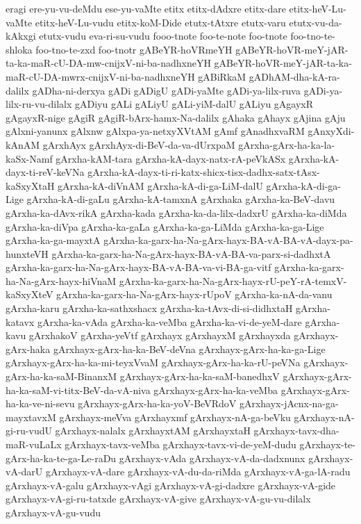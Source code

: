 {eragi
ere-yu-vu-deMdu
ese-yu-vaMte
etitx
etitx-dAdxre
etitx-dare
etitx-heV-Lu-vaMte
etitx-heV-Lu-vudu
etitx-koM-Dide
etutx-tAtxre
etutx-varu
etutx-vu-da-kAkxgi
etutx-vudu
eva-ri-su-vudu
fooo-tnote
foo-te-note
foo-tnote
foo-tno-te-shloka
foo-tno-te-zxd
foo-tnotr
gABeYR-hoVRmeYH
gABeYR-hoVR-meY-jAR-ta-ka-maR-cU-DA-mw-cnijxV-ni-ba-nadhxneYH
gABeYR-hoVR-meY-jAR-ta-ka-maR-cU-DA-mwrx-cnijxV-ni-ba-nadhxneYH
gABiRkaM
gADhAM-dha-kA-ra-dalilx
gADha-ni-derxya
gADi
gADigU
gADi-yaMte
gADi-ya-lilx-ruva
gADi-ya-lilx-ru-vu-dilalx
gADiyu
gALi
gALiyU
gALi-yiM-dalU
gALiyu
gAgayxR
gAgayxR-nige
gAgiR
gAgiR-bArx-hamx-Na-dalilx
gAhaka
gAhayx
gAjina
gAju
gAlxni-yanunx
gAlxnw
gAlxpa-ya-netxyXVtAM
gAmf
gAnadhxvaRM
gAnxyXdi-kAnAM
gArxhAyx
gArxhAyx-di-BeV-da-va-dUrxpaM
gArxha-gArx-ha-ka-la-kaSx-Namf
gArxha-kAM-tara
gArxha-kA-dayx-natx-rA-peVkASx
gArxha-kA-dayx-ti-reV-keVNa
gArxha-kA-dayx-ti-ri-katx-shicx-tisx-dadhx-satx-tAsx-kaSxyXtaH
gArxha-kA-diVnAM
gArxha-kA-di-ga-LiM-dalU
gArxha-kA-di-ga-Lige
gArxha-kA-di-gaLu
gArxha-kA-tamxnA
gArxhaka
gArxha-ka-BeV-davu
gArxha-ka-dAvx-rikA
gArxha-kada
gArxha-ka-da-lilx-dadxrU
gArxha-ka-diMda
gArxha-ka-diVpa
gArxha-ka-gaLa
gArxha-ka-ga-LiMda
gArxha-ka-ga-Lige
gArxha-ka-ga-mayxtA
gArxha-ka-garx-ha-Na-gArx-hayx-BA-vA-BA-vA-dayx-pa-hunxteVH
gArxha-ka-garx-ha-Na-gArx-hayx-BA-vA-BA-va-parx-si-dadhxtA
gArxha-ka-garx-ha-Na-gArx-hayx-BA-vA-BA-va-vi-BA-ga-vitf
gArxha-ka-garx-ha-Na-gArx-hayx-hiVnaM
gArxha-ka-garx-ha-Na-gArx-hayx-rU-peY-rA-temxV-kaSxyXteV
gArxha-ka-garx-ha-Na-gArx-hayx-rUpoV
gArxha-ka-nA-da-vanu
gArxha-karu
gArxha-ka-sathxshacx
gArxha-ka-tAvx-di-si-didhxtaH
gArxha-katavx
gArxha-ka-vAda
gArxha-ka-veMba
gArxha-ka-vi-de-yeM-dare
gArxha-kavu
gArxhakoV
gArxha-yeVtf
gArxhayx
gArxhayxM
gArxhayxda
gArxhayx-gArx-haka
gArxhayx-gArx-ha-ka-BeV-deVna
gArxhayx-gArx-ha-ka-ga-Lige
gArxhayx-gArx-ha-ka-mi-teyxVvaM
gArxhayx-gArx-ha-ka-rU-peVNa
gArxhayx-gArx-ha-ka-saM-BinanxM
gArxhayx-gArx-ha-ka-saM-banedhxV
gArxhayx-gArx-ha-ka-saM-vi-titx-BeV-da-vA-niva
gArxhayx-gArx-ha-ka-veMba
gArxhayx-gArx-ha-ka-ve-ni-sevu
gArxhayx-gArx-ha-ka-yoV-BeVRdoV
gArxhayx-jAcnx-na-ga-mayxtavxM
gArxhayx-meVva
gArxhayxmf
gArxhayx-nA-ga-beVku
gArxhayx-nA-gi-ru-vudU
gArxhayx-nalalx
gArxhayxtAM
gArxhayxtaH
gArxhayx-tavx-dha-maR-vuLaLx
gArxhayx-tavx-veMba
gArxhayx-tavx-vi-de-yeM-dudu
gArxhayx-te-gArx-ha-ka-te-ga-Le-raDu
gArxhayx-vAda
gArxhayx-vA-da-dadxnunx
gArxhayx-vA-darU
gArxhayx-vA-dare
gArxhayx-vA-du-da-riMda
gArxhayx-vA-ga-lA-radu
gArxhayx-vA-galu
gArxhayx-vAgi
gArxhayx-vA-gi-dadxre
gArxhayx-vA-gide
gArxhayx-vA-gi-ru-tatxde
gArxhayx-vA-give
gArxhayx-vA-gu-vu-dilalx
gArxhayx-vA-gu-vudu
}
